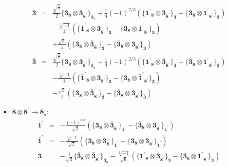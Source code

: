\documentclass[english]{article}
\newcommand{\subcg}[3]{\big\{ {#1}\otimes{#2}\big\}^{}_{#3}}
\newcommand{\rep}[1]{\mathbf{#1}}
\begin{document}
\begin{itemize}
\begin{eqnarray*}
\\
\rep{3} &=& \frac{\sqrt{\frac{3}{2}}}{2}\subcg{\rep{\bar{3}}_{\rep{8}}}{\rep{\bar{3}}_{\rep{8^{\prime}}}}{\rep{3}_{a}}+\frac{1}{4} (-1)^{2/3}\left(\subcg{\rep{1^{\prime}}_{\rep{8}}}{\rep{3}_{\rep{8^{\prime}}}}{\rep{3}}-\subcg{\rep{3}_{\rep{8}}}{\rep{1^{\prime}}_{\rep{8^{\prime}}}}{\rep{3}}\right) \\ 
 & & -\frac{\sqrt[3]{-1}}{4}\left(\subcg{\rep{\bar{1}^{\prime}}_{\rep{8}}}{\rep{3}_{\rep{8^{\prime}}}}{\rep{3}}-\subcg{\rep{3}_{\rep{8}}}{\rep{\bar{1}^{\prime}}_{\rep{8^{\prime}}}}{\rep{3}}\right) \\ 
 & & +\frac{\sqrt{3}}{4}\left(\subcg{\rep{3}_{\rep{8}}}{\rep{\bar{3}}_{\rep{8^{\prime}}}}{\rep{3}}-\subcg{\rep{\bar{3}}_{\rep{8}}}{\rep{3}_{\rep{8^{\prime}}}}{\rep{3}}\right)
\\
\rep{\bar{3}} &=& \frac{\sqrt{\frac{3}{2}}}{2}\subcg{\rep{3}_{\rep{8}}}{\rep{3}_{\rep{8^{\prime}}}}{\rep{\bar{3}}_{a}}+\frac{1}{4} (-1)^{2/3}\left(\subcg{\rep{1^{\prime}}_{\rep{8}}}{\rep{\bar{3}}_{\rep{8^{\prime}}}}{\rep{\bar{3}}}-\subcg{\rep{\bar{3}}_{\rep{8}}}{\rep{1^{\prime}}_{\rep{8^{\prime}}}}{\rep{\bar{3}}}\right) \\ 
 & & -\frac{\sqrt[3]{-1}}{4}\left(\subcg{\rep{\bar{1}^{\prime}}_{\rep{8}}}{\rep{\bar{3}}_{\rep{8^{\prime}}}}{\rep{\bar{3}}}-\subcg{\rep{\bar{3}}_{\rep{8}}}{\rep{\bar{1}^{\prime}}_{\rep{8^{\prime}}}}{\rep{\bar{3}}}\right) \\ 
 & & -\frac{\sqrt{3}}{4}\left(\subcg{\rep{3}_{\rep{8}}}{\rep{\bar{3}}_{\rep{8^{\prime}}}}{\rep{\bar{3}}}-\subcg{\rep{\bar{3}}_{\rep{8}}}{\rep{3}_{\rep{8^{\prime}}}}{\rep{\bar{3}}}\right)
\end{eqnarray*}
\item $\rep{8}\otimes\rep{8^{\prime}}\to\rep{8}_{a}$:
\begin{eqnarray*}
\rep{1^{\prime}} &=& -\frac{(-1)^{2/3}}{\sqrt{2}}\left(\subcg{\rep{3}_{\rep{8}}}{\rep{\bar{3}}_{\rep{8^{\prime}}}}{\rep{1^{\prime}}}-\subcg{\rep{\bar{3}}_{\rep{8}}}{\rep{3}_{\rep{8^{\prime}}}}{\rep{1^{\prime}}}\right)
\\
\rep{\bar{1}^{\prime}} &=& -\frac{\sqrt[3]{-1}}{\sqrt{2}}\left(\subcg{\rep{3}_{\rep{8}}}{\rep{\bar{3}}_{\rep{8^{\prime}}}}{\rep{\bar{1}^{\prime}}}-\subcg{\rep{\bar{3}}_{\rep{8}}}{\rep{3}_{\rep{8^{\prime}}}}{\rep{\bar{1}^{\prime}}}\right)
\\
\rep{3} &=& -\frac{i}{\sqrt{3}}\subcg{\rep{\bar{3}}_{\rep{8}}}{\rep{\bar{3}}_{\rep{8^{\prime}}}}{\rep{3}_{a}}-\frac{\sqrt[3]{-1}}{\sqrt{6}}\left(\subcg{\rep{1^{\prime}}_{\rep{8}}}{\rep{3}_{\rep{8^{\prime}}}}{\rep{3}}-\subcg{\rep{3}_{\rep{8}}}{\rep{1^{\prime}}_{\rep{8^{\prime}}}}{\rep{3}}\right) \\ 

\end{eqnarray*}
\end{itemize}
\end{document}
